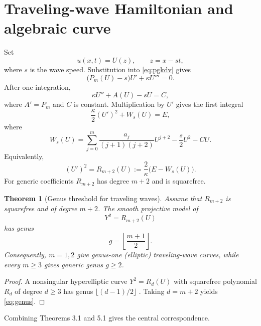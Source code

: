 \documentclass[11pt]{article}
\newtheorem{theorem}{Theorem}[section]
\begin{document}
\section{Traveling-wave Hamiltonian and algebraic curve}
Set
\begin{equation}
 u(x,t)=U(z),\qquad z=x-st,
 \label{eq:tw}
\end{equation}
where $s$ is the wave speed.  Substitution into \eqref{eq:pgkdv} gives
\[
 \bigl(P_m(U)-s\bigr)U'+\kappa U'''=0.
\]
After one integration,
\begin{equation}
 \kappa U''+A(U)-sU=C,
 \label{eq:tw2}
\end{equation}
where $A'=P_m$ and $C$ is constant.  Multiplication by $U'$ gives the first integral
\begin{equation}
 \frac{\kappa}{2}(U')^2+W_s(U)=E,
 \label{eq:energy}
\end{equation}
where
\begin{equation}
 W_s(U)=\sum_{j=0}^{m}\frac{a_j}{(j+1)(j+2)}U^{j+2}
 -\frac{s}{2}U^2-CU.
 \label{eq:potential}
\end{equation}
Equivalently,
\begin{equation}
 (U')^2=R_{m+2}(U):=\frac{2}{\kappa}\bigl(E-W_s(U)\bigr).
 \label{eq:curve}
\end{equation}
For generic coefficients $R_{m+2}$ has degree $m+2$ and is squarefree.

\begin{theorem}[Genus threshold for traveling waves]
Assume that $R_{m+2}$ is squarefree and of degree $m+2$.  The smooth projective model of
\begin{equation}
 Y^2=R_{m+2}(U)
 \label{eq:hypercurve}
\end{equation}
has genus
\begin{equation}
 g=\left\lfloor\frac{m+1}{2}\right\rfloor.
 \label{eq:genus}
\end{equation}
Consequently, $m=1,2$ give genus-one (elliptic) traveling-wave curves, while every $m\ge3$ gives generic genus $g\ge2$.
\end{theorem}

\begin{proof}
A nonsingular hyperelliptic curve $Y^2=R_d(U)$ with squarefree polynomial $R_d$ of degree $d\ge3$ has genus $\lfloor(d-1)/2\rfloor$ \citep{farkas1992}.  Taking $d=m+2$ yields \eqref{eq:genus}.
\end{proof}

Combining Theorems 3.1 and 5.1 gives the central correspondence.
\end{document}
